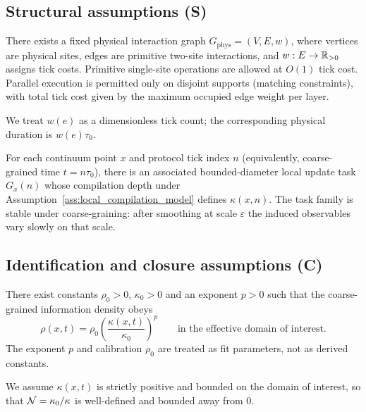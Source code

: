 \subsection{Structural assumptions (S)}
\label{subsec:assumptions_structural}

\begin{assumption}
\label{ass:local_compilation_model}
There exists a fixed physical interaction graph $G_{\mathrm{phys}}=(V,E,w)$, where vertices are physical sites, edges are primitive two-site interactions, and $w:E\to\mathbb{R}_{>0}$ assigns tick costs.
Primitive single-site operations are allowed at $O(1)$ tick cost.
Parallel execution is permitted only on disjoint supports (matching constraints), with total tick cost given by the maximum occupied edge weight per layer.
\par
\noindent We treat $w(e)$ as a dimensionless tick count; the corresponding physical duration is $w(e)\tau_0$.
\end{assumption}

\begin{assumption}
\label{ass:local_task_family}
For each continuum point $x$ and protocol tick index $n$ (equivalently, coarse-grained time $t=n\tau_0$), there is an associated bounded-diameter local update task $G_x(n)$ whose compilation depth under Assumption~\ref{ass:local_compilation_model} defines $\kappa(x,n)$.
The task family is stable under coarse-graining: after smoothing at scale $\varepsilon$ the induced observables vary slowly on that scale.
\end{assumption}

\subsection{Identification and closure assumptions (C)}
\label{subsec:assumptions_closure}

\begin{assumption}
\label{ass:cost_to_density}
There exist constants $\rho_0>0$, $\kappa_0>0$ and an exponent $p>0$ such that the coarse-grained information density obeys
\begin{equation}
  \rho(x,t)=\rho_0\left(\frac{\kappa(x,t)}{\kappa_0}\right)^p
  \qquad\text{in the effective domain of interest.}
\end{equation}
The exponent $p$ and calibration $\rho_0$ are treated as fit parameters, not as derived constants.
\par
\noindent We assume $\kappa(x,t)$ is strictly positive and bounded on the domain of interest, so that $\mathcal{N}=\kappa_0/\kappa$ is well-defined and bounded away from $0$.
\end{assumption}

